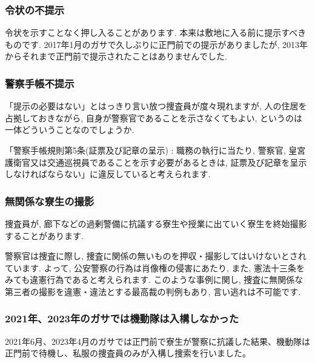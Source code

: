      
			\subsubsection{令状の不提示}
			令状を示すことなく押し入ることがあります. 本来は敷地に入る前に提示すべきものです. 2017年1月のガサで久しぶりに正門前での提示がありましたが, 2013年からそれまで正門前で提示されたことはありませんでした.

			\subsubsection{警察手帳不提示}
			「提示の必要はない」とはっきり言い放つ捜査員が度々現れますが, 人の住居を占拠しておきながら, 自身が警察官であることを示さなくてもよい, というのは一体どういうことなのでしょうか.

			「警察手帳規則第5条(証票及び記章の呈示) : 職務の執行に当たり, 警察官, 皇宮護衛官又は交通巡視員であることを示す必要があるときは, 証票及び記章を呈示しなければならない」に違反していると考えられます.

			\subsubsection{無関係な寮生の撮影}
			捜査員が, 廊下などの過剰警備に抗議する寮生や授業に出ていく寮生を終始撮影することがあります.

			警察官は捜査に際し, 捜査に関係の無いものを押収・撮影してはいけないとされています. よって, 公安警察の行為は肖像権の侵害にあたり, また, 憲法十三条をみても違憲行為であると考えられます. このような事例に関し, 捜査に無関係な第三者の撮影を違憲・違法とする最高裁の判例もあり, 言い逃れは不可能です.

			\subsubsection{2021年、2023年のガサでは機動隊は入構しなかった}
			2021年6月、2023年4月のガサでは正門前で寮生が警察に抗議した結果、機動隊は正門前で待機し、私服の捜査員のみが入構し捜索を行いました。
			